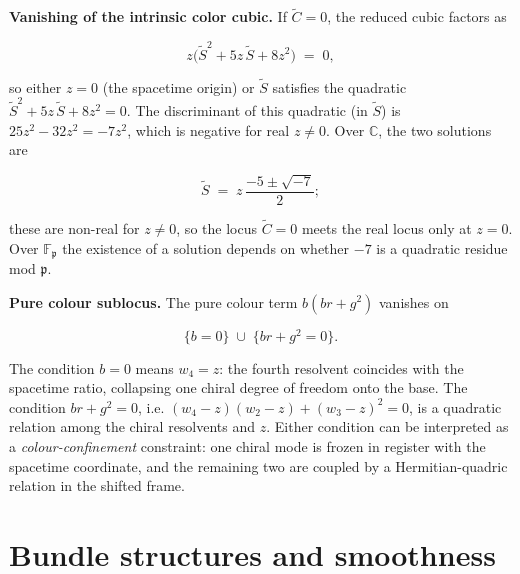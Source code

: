 \begin{remark}[Sublocus $\widetilde{C}=0$ and colour confinement]
  \label{rem:color-tube-subloci}
\textbf{Vanishing of the intrinsic color cubic.}
If $\widetilde{C} = 0$, the reduced cubic factors as

\begin{equation}\label{eq:reduced-cubic-factored}
  z\bigl(\widetilde{S}^2 + 5z\,\widetilde{S} + 8z^2\bigr) \;=\; 0,
\end{equation}

so either $z = 0$ (the spacetime origin) or $\widetilde{S}$ satisfies
the quadratic $\widetilde{S}^2 + 5z\,\widetilde{S} + 8z^2 = 0$.
The discriminant of this quadratic (in $\widetilde{S}$) is
$25z^2 - 32z^2 = -7z^2$, which is negative for real $z \ne 0$.
Over $\mathbb{C}$, the two solutions are

\[
\widetilde{S} \;=\; z\,\frac{-5 \pm \sqrt{-7}}{2};
\]

these are non-real for $z \ne 0$, so the locus $\widetilde{C} = 0$
meets the real locus only at $z = 0$.  Over $\mathbb{F}_\mathfrak{p}$ the
existence of a solution depends on whether $-7$ is a quadratic
residue mod $\mathfrak{p}$.

\textbf{Pure colour sublocus.}
The pure colour term $b(br + g^2)$
vanishes on

\[
\{b = 0\} \;\cup\; \{br + g^2 = 0\}.
\]

The condition $b = 0$ means $w_4 = z$: the fourth resolvent
coincides with the spacetime ratio, collapsing one chiral degree of
freedom onto the base.  The condition $br + g^2 = 0$, i.e.
$(w_4 - z)(w_2 - z) + (w_3 - z)^2 = 0$, is a quadratic relation
among the chiral resolvents and $z$.  Either condition can be
interpreted as a \emph{colour-confinement} constraint: one chiral
mode is frozen in register with the spacetime coordinate, and the
remaining two are coupled by a Hermitian-quadric relation in the
shifted frame.
\end{remark}

\section{Bundle structures and smoothness}
\label{sec:bundle-structures}

